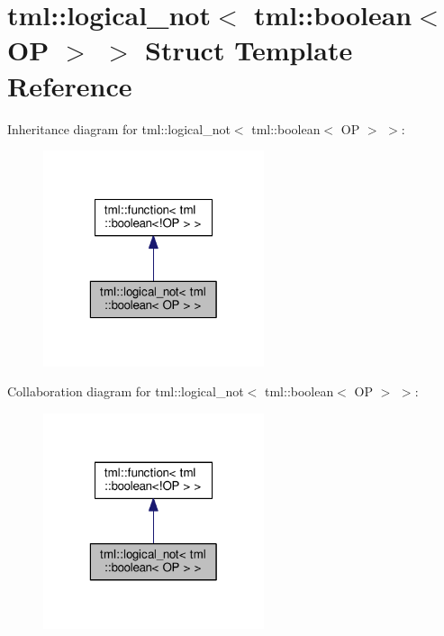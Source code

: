 \hypertarget{structtml_1_1logical__not_3_01tml_1_1boolean_3_01_o_p_01_4_01_4}{\section{tml\+:\+:logical\+\_\+not$<$ tml\+:\+:boolean$<$ O\+P $>$ $>$ Struct Template Reference}
\label{structtml_1_1logical__not_3_01tml_1_1boolean_3_01_o_p_01_4_01_4}
}


Inheritance diagram for tml\+:\+:logical\+\_\+not$<$ tml\+:\+:boolean$<$ O\+P $>$ $>$\+:
\nopagebreak
\begin{figure}[H]
\begin{center}
\leavevmode
\includegraphics[width=184pt]{structtml_1_1logical__not_3_01tml_1_1boolean_3_01_o_p_01_4_01_4__inherit__graph}
\end{center}
\end{figure}


Collaboration diagram for tml\+:\+:logical\+\_\+not$<$ tml\+:\+:boolean$<$ O\+P $>$ $>$\+:
\nopagebreak
\begin{figure}[H]
\begin{center}
\leavevmode
\includegraphics[width=184pt]{structtml_1_1logical__not_3_01tml_1_1boolean_3_01_o_p_01_4_01_4__coll__graph}
\end{center}
\end{figure}
